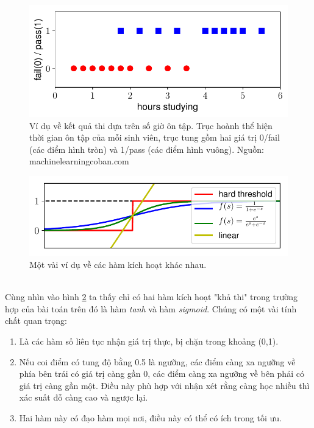 \documentclass{article}
\begin{document}
\begin{figure}[ht!]
\begin{minipage}[c]{0.47\linewidth}
\includegraphics[width = \linewidth]{ex1.pdf}
\end{minipage} \hfill
\begin{minipage}[c]{0.5\linewidth}
    \caption{Ví dụ về kết quả thi dựa trên số giờ ôn tập. Trục hoành thể hiện thời gian ôn tập của mỗi sinh viên, trục tung gồm hai giá trị 0/fail (các điểm hình tròn) và 1/pass (các điểm hình vuông). Nguồn: machinelearningcoban.com 
}
    \label{fig13}
\end{minipage}
\end{figure}
\begin{figure}[ht!]
\begin{minipage}[c]{0.47\linewidth}
\includegraphics[width = \linewidth]{activation.pdf}
\end{minipage} \hfill
\begin{minipage}[c]{0.5\linewidth}
    \caption{Một vài ví dụ về các hàm kích hoạt khác nhau.  
}
    \label{fig14}
\end{minipage}
\end{figure}
\phantom{a}\\
Cùng nhìn vào hình \ref{fig14} ta thấy chỉ có hai hàm kích hoạt "khả thi" trong trường hợp của bài toán trên đó là hàm \textit{tanh} và hàm \textit{sigmoid}. Chúng có một vài tính chất quan trọng:
\begin{enumerate}
    \item Là các hàm số liên tục nhận giá trị thực, bị chặn trong khoảng (0,1).
    \item Nếu coi điểm có tung độ bằng 0.5 là ngưỡng, các điểm càng xa ngưỡng về phía bên trái có giá trị càng gần 0, các điểm càng xa ngưỡng về bên phải có giá trị càng gần một. Điều này phù hợp với nhận xét rằng càng học nhiều thì xác suất đỗ càng cao và ngược lại.
    \item Hai hàm này có đạo hàm mọi nơi, điều này có thể có ích trong tối ưu.
\end{enumerate}
\end{document}

